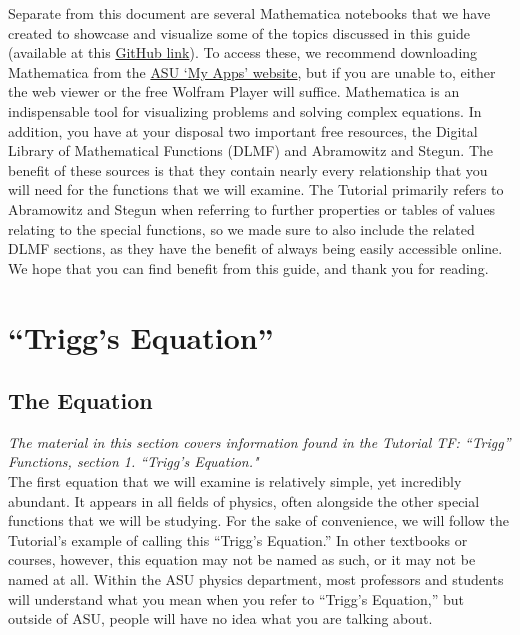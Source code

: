 \documentclass[11pt]{report}
\begin{document}
Separate from this document are several Mathematica notebooks that we have created to showcase and visualize some of the topics discussed in this guide (available at this \href{https://github.com/TSkinne4/Students-Guide-to-Special-Functions/tree/main}{GitHub link}). To access these, we recommend downloading Mathematica from the \href{https://myapps.asu.edu/app/mathematica-0}{ASU `My Apps' website}, but if you are unable to, either the web viewer or the free Wolfram Player will suffice. Mathematica is an indispensable tool for visualizing problems and solving complex equations. In addition, you have at your disposal two important free resources, the Digital Library of Mathematical Functions (DLMF) and Abramowitz and Stegun. The benefit of these sources is that they contain nearly every relationship that you will need for the functions that we will examine. The Tutorial primarily refers to Abramowitz and Stegun when referring to further properties or tables of values relating to the special functions, so we made sure to also include the related DLMF sections, as they have the benefit of always being easily accessible online.\\

We hope that you can find benefit from this guide, and thank you for reading.

\tableofcontents

\chapter{``Trigg's Equation''}




\section{The Equation}

\emph{The material in this section covers information found in the Tutorial TF: “Trigg” Functions, section 1. “Trigg's Equation."}\\

The first equation that we will examine is relatively simple, yet incredibly abundant. It appears in all fields of physics, often alongside the other special functions that we will be studying. For the sake of convenience, we will follow the Tutorial's example of calling this ``Trigg's Equation.'' In other textbooks or courses, however, this equation may not be named as such, or it may not be named at all. Within the ASU physics department, most professors and students will understand what you mean when you refer to ``Trigg's Equation,'' but outside of ASU, people will have no idea what you are talking about.\\
\end{document}

